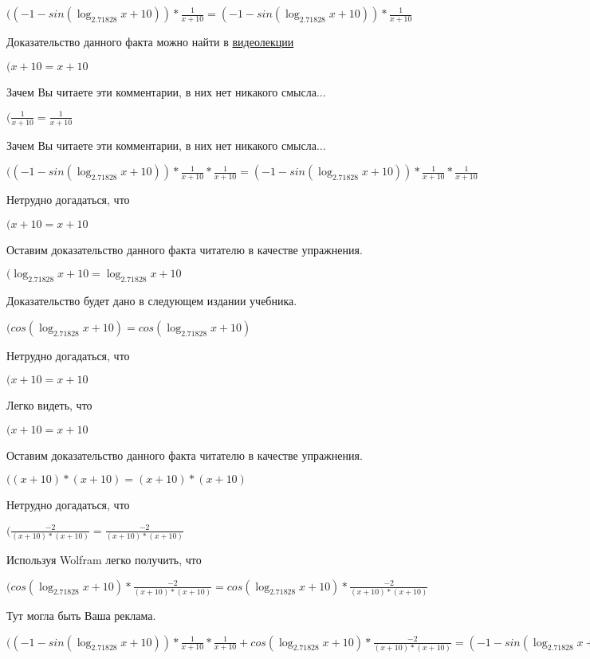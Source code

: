 \documentclass[12pt,a4paper,fleqn]{article}
\theoremstyle{definition}
\begin{document}
$(( -1  - sin(\log_{ 2.71828 }{ x  +  10 })) * \frac{ 1 }{ x  +  10 }
 = ( -1  - sin(\log_{ 2.71828 }{ x  +  10 })) * \frac{ 1 }{ x  +  10 }
$

Доказательство данного факта можно найти в \href{https://www.youtube.com/watch?v=dQw4w9WgXcQ}{видеолекции}

$( x  +  10  =  x  +  10 $

Зачем Вы читаете эти комментарии, в них нет никакого смысла...

$(\frac{ 1 }{ x  +  10 }
 = \frac{ 1 }{ x  +  10 }
$

Зачем Вы читаете эти комментарии, в них нет никакого смысла...

$(( -1  - sin(\log_{ 2.71828 }{ x  +  10 })) * \frac{ 1 }{ x  +  10 }
 * \frac{ 1 }{ x  +  10 }
 = ( -1  - sin(\log_{ 2.71828 }{ x  +  10 })) * \frac{ 1 }{ x  +  10 }
 * \frac{ 1 }{ x  +  10 }
$

Нетрудно догадаться, что

$( x  +  10  =  x  +  10 $

Оставим доказательство данного факта читателю в качестве упражнения.

$(\log_{ 2.71828 }{ x  +  10 } = \log_{ 2.71828 }{ x  +  10 }$

Доказательство будет дано в следующем издании учебника.

$(cos(\log_{ 2.71828 }{ x  +  10 }) = cos(\log_{ 2.71828 }{ x  +  10 })$

Нетрудно догадаться, что

$( x  +  10  =  x  +  10 $

Легко видеть, что

$( x  +  10  =  x  +  10 $

Оставим доказательство данного факта читателю в качестве упражнения.

$(( x  +  10 ) * ( x  +  10 ) = ( x  +  10 ) * ( x  +  10 )$

Нетрудно догадаться, что

$(\frac{ -2 }{( x  +  10 ) * ( x  +  10 )}
 = \frac{ -2 }{( x  +  10 ) * ( x  +  10 )}
$

Используя Wolfram легко получить, что

$(cos(\log_{ 2.71828 }{ x  +  10 }) * \frac{ -2 }{( x  +  10 ) * ( x  +  10 )}
 = cos(\log_{ 2.71828 }{ x  +  10 }) * \frac{ -2 }{( x  +  10 ) * ( x  +  10 )}
$

Тут могла быть Ваша реклама.

$(( -1  - sin(\log_{ 2.71828 }{ x  +  10 })) * \frac{ 1 }{ x  +  10 }
 * \frac{ 1 }{ x  +  10 }
 + cos(\log_{ 2.71828 }{ x  +  10 }) * \frac{ -2 }{( x  +  10 ) * ( x  +  10 )}
 = ( -1  - sin(\log_{ 2.71828 }{ x  +  10 })) * \frac{ 1 }{ x  +  10 }
 * \frac{ 1 }{ x  +  10 }
 + cos(\log_{ 2.71828 }{ x  +  10 }) * \frac{ -2 }{( x  +  10 ) * ( x  +  10 )}
$
\end{document}

